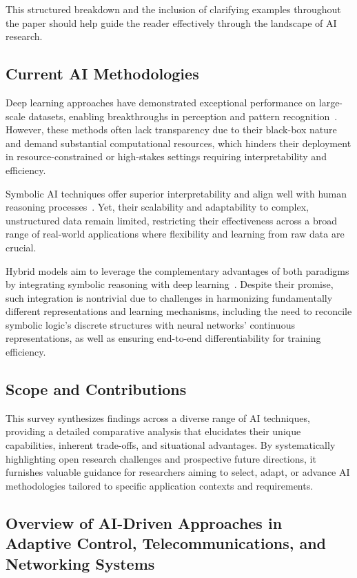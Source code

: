 \documentclass[sigconf]{acmart}
\begin{document}
This structured breakdown and the inclusion of clarifying examples throughout the paper should help guide the reader effectively through the landscape of AI research.

\subsection{Current AI Methodologies}

Deep learning approaches have demonstrated exceptional performance on large-scale datasets, enabling breakthroughs in perception and pattern recognition~\cite{liu2021deep}. However, these methods often lack transparency due to their black-box nature and demand substantial computational resources, which hinders their deployment in resource-constrained or high-stakes settings requiring interpretability and efficiency.

Symbolic AI techniques offer superior interpretability and align well with human reasoning processes~\cite{miller2018symbolic}. Yet, their scalability and adaptability to complex, unstructured data remain limited, restricting their effectiveness across a broad range of real-world applications where flexibility and learning from raw data are crucial.

Hybrid models aim to leverage the complementary advantages of both paradigms by integrating symbolic reasoning with deep learning~\cite{chen2022hybrid}. Despite their promise, such integration is nontrivial due to challenges in harmonizing fundamentally different representations and learning mechanisms, including the need to reconcile symbolic logic's discrete structures with neural networks' continuous representations, as well as ensuring end-to-end differentiability for training efficiency.

\subsection{Scope and Contributions}

This survey synthesizes findings across a diverse range of AI techniques, providing a detailed comparative analysis that elucidates their unique capabilities, inherent trade-offs, and situational advantages. By systematically highlighting open research challenges and prospective future directions, it furnishes valuable guidance for researchers aiming to select, adapt, or advance AI methodologies tailored to specific application contexts and requirements.

\subsection{Overview of AI-Driven Approaches in Adaptive Control, Telecommunications, and Networking Systems}
\end{document}
